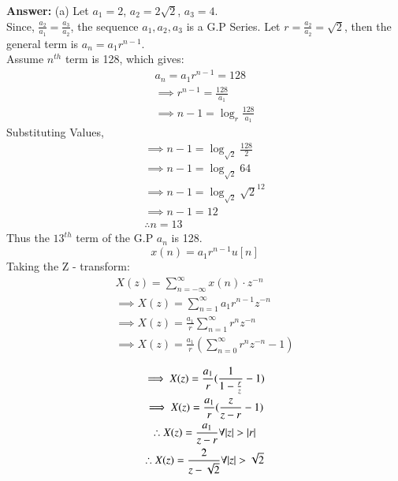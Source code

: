 \documentclass[journal,12pt,twocolumn]{IEEEtran}
\theoremstyle{remark}
\begin{document}
\textbf{Answer:} (a) Let $a_1 = 2$, $a_2 = 2\sqrt{2}$, $a_3 = 4$.\\
Since, $\frac{a_2}{a_1} = \frac{a_3}{a_2}$, the sequence $a_1, a_2, a_3$ is a G.P Series.
Let $r = \frac{a_2}{a_2} = \sqrt{2}$, then the general term is $a_n = a_1 r^{n-1}$.\\
Assume $n^{th}$ term is 128, which gives: 
\begin{gather*}
    a_n = a_1 r^{n-1} = 128\\
    \implies r^{n-1} = \frac{128}{a_1}\\
    \implies n - 1 = \log_{r}{\frac{128}{a_1}}
\end{gather*}
Substituting Values,
\begin{gather*}
    \implies n - 1 = \log_{\sqrt{2}}{\frac{128}{2}}\\
    \implies n - 1 = \log_{\sqrt{2}}{64}\\
    \implies n - 1 = \log_{\sqrt{2}}{\sqrt{2}^{12}}\\
    \implies n - 1 = 12\\
    \therefore n = 13
\end{gather*}
Thus the $13^{th}$ term of the G.P $a_n$ is 128.\\ 
\[ x(n) = a_1r^{n - 1}u[n] \]
Taking the Z - transform:
\begin{gather*}
    X(z) = \sum_{n = -\infty}^{\infty}{x(n) \cdot z^{-n}}\\
    \implies X(z) = \sum_{n = 1}^{\infty}{a_1r^{n - 1}z^{-n}}\\
    \implies X(z) = \frac{a_1}{r}\sum_{n = 1}^{\infty}{r^n z^{-n}}\\
    \implies X(z) = \frac{a_1}{r}(\sum_{n = 0}^{\infty}{r^n z^{-n}} - 1)\\
\end{gather*}
\begin{gather*}
    \implies X(z) = \frac{a_1}{r}(\frac{1}{1 - \frac{r}{z}} - 1)\\
    \implies X(z) = \frac{a_1}{r}(\frac{z}{z - r} - 1)\\
    \therefore X(z) = \frac{a_1}{z - r}\forall { \left\vert z\right\vert > \left\vert r\right\vert}\\
    \therefore X(z) = \frac{2}{z - \sqrt{2}}\forall { \left\vert z\right\vert > \sqrt{2}}
\end{gather*}
\end{document}
